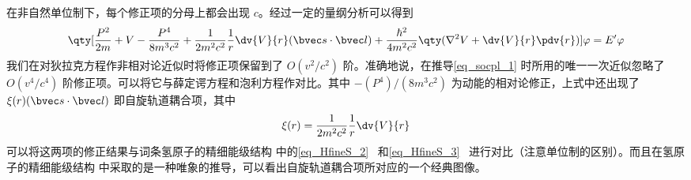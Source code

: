 在非自然单位制下，每个修正项的分母上都会出现 $c$。经过一定的量纲分析可以得到
\begin{equation}\label{eq_socpl_4}
\qty[\frac{P^2}{2m}+V-\frac{P^4}{8m^3c^2}+\frac{1}{2m^2c^2}\frac{1}{r}\dv{V}{r}(\bvec s\cdot \bvec l)+\frac{\hbar^2}{4m^2c^2}\qty(\nabla^2 V+\dv{V}{r}\pdv{r})]\varphi = E'\varphi
\end{equation}
我们在对狄拉克方程作非相对论近似时将修正项保留到了 $O(v^2/c^2)$ 阶。准确地说，在推导\autoref{eq_socpl_1} 时所用的唯一一次近似忽略了 $O(v^4/c^4)$ 阶修正项。可以将它与薛定谔方程和泡利方程作对比。其中 $-(P^4)/(8m^3c^2)$ 为动能的相对论修正，上式中还出现了 $\xi(r)(\bvec s\cdot \bvec l)$ 即自旋轨道耦合项，其中
\begin{equation}
\xi(r)=\frac{1}{2m^2c^2}\frac{1}{r}\dv{V}{r}
\end{equation}
可以将这两项的修正结果与词条氢原子的精细能级结构 中的\autoref{eq_HfineS_2}~ 和\autoref{eq_HfineS_3}~ 进行对比（注意单位制的区别）。而且在氢原子的精细能级结构 中采取的是一种唯象的推导，可以看出自旋轨道耦合项所对应的一个经典图像。

